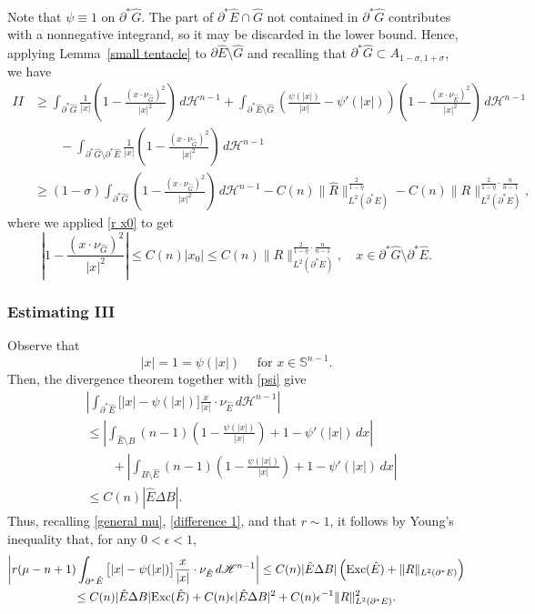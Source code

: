 \documentclass[reqno,11pt]{amsart}
\def\ez{\epsilon}
\def\sz{\sigma}
\numberwithin{equation}{section}
\theoremstyle{remark}
\begin{document}
Note that $\psi\equiv 1$ on $\partial^* \hat G.$ 
The part of $\partial^*\hat E\cap\hat G$ not contained in $\partial^*\hat G$
contributes with a nonnegative integrand, so it may be discarded in the lower bound. Hence,
applying Lemma~\ref{small tentacle} to $\partial\hat E\setminus \hat G$ and
recalling that $\partial^* \hat G \subset A_{1-\sigma,1+\sigma}$, we have
\begin{align}
II &\ge \int_{\partial^* \hat G}  \frac{1}{|x|}  \left(1-\frac{(x\cdot \nu_{\hat G})^2}{|x|^2}\right) \, d\mathscr H^{n-1} +  \int_{\partial^*  \hat E\setminus \hat G}  \left(\frac{\psi(|x|)}{|x|} -  \psi'(|x|)\right)\left(1-\frac{(x\cdot \nu_{\hat E})^2}{|x|^2}\right) \, d\mathscr H^{n-1}\nonumber\\
& \quad\quad -  \int_{\partial^*  \hat G\setminus\partial^* \hat E}  \frac{1}{|x|}  \left(1-\frac{(x\cdot \nu_{\hat G})^2}{|x|^2}\right) \, d\mathscr H^{n-1} \nonumber\\
&\ge  (1-\sz) \int_{\partial^* \hat G}   \left(1-\frac{(x\cdot \nu_{\hat G})^2}{|x|^2}\right) \, d\mathscr H^{n-1}  - C(n) \|\hat  R\|_{L^2(\partial^* \hat E)}^{\frac{2}{1-\eta}}-C(n)\|R\|_{L^2(\partial^*E)}^{\frac{2}{1-\eta}\cdot \frac{n}{n-1}}, \label{2nd term}
\end{align}
where we applied \eqref{r x0} to get
$$ \left|1-\frac{(x\cdot \nu_{\hat G})^2}{|x|^2}\right| \le C(n)|x_0|\le C(n)\|R\|_{L^2(\partial^*E)}^{\frac{2}{1-\eta}\cdot \frac{n}{n-1}}, \quad x\in \partial^*  \hat G\setminus\partial^* \hat E.$$


\subsubsection*{Estimating III}
Observe that 
$$|x|=1=\psi(|x|)  \quad  \text{ for } x\in \mathbb S^{n-1}.$$
Then, the divergence theorem together with \eqref{psi} give
\begin{align*} 
  &\left|\int_{\partial^* \hat E}  \big[|x|-\psi(|x|)\big] \frac{x}{|x|}\cdot \nu_{\hat E} \, d\mathscr H^{n-1}\right| \\
&\le \left|\int_{\hat E\setminus B} (n-1) \left(1-\frac{\psi(|x|)}{|x|}\right)+1-\psi'(|x|)\, dx\right|\\
&\quad\quad + \left|\int_{B\setminus \hat E} (n-1) \left(1-\frac{\psi(|x|)}{|x|}\right)+1-\psi'(|x|)\, dx\right|\\
&\le C(n)|\hat E\Delta B|.
\end{align*}
Thus, recalling \eqref{general mu}, \eqref{difference 1}, and that $r \sim 1$,
it follows by Young's inequality that, for any $0<\ez<1$,
\begin{multline} 
  \left|r(\mu-n+1)  \int_{\partial^* \hat E}  \big[|x|-\psi(|x|)\big] \frac{x}{|x|}\cdot \nu_{\hat E} \, d\mathscr H^{n-1}\right|
 \le   C(n )   |\hat E\Delta B| \left( {\rm Exc}(\hat E)  +  \| R\|_{L^2(\partial^* E)}\right) \\
  \le  C(n )     |\hat E\Delta B| {\rm Exc}(\hat E)  +C(n)\ez |\hat E\Delta B|^2+   C(n)\ez^{-1}\| R\|^2_{L^2(\partial^*E)}. \label{mu term}
\end{multline}
\end{document}
